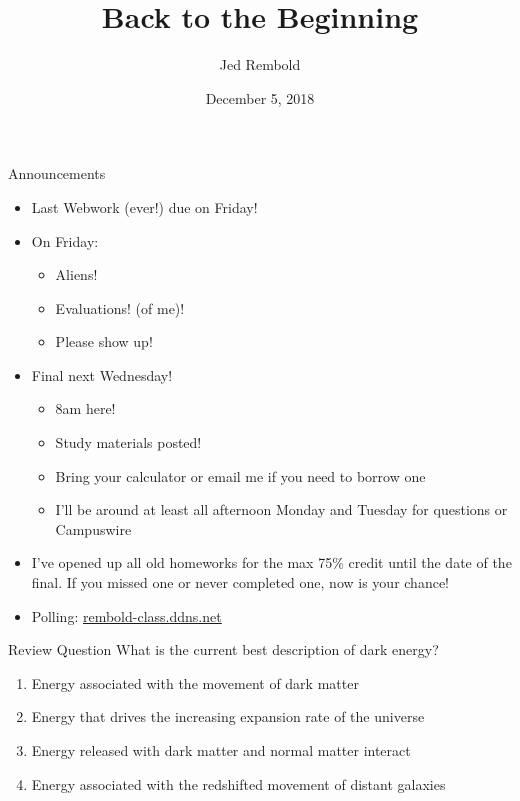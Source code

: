 \documentclass[pdf,aspectratio=169]{beamer}
\title{Back to the Beginning}
\date{December 5, 2018}
\author{Jed Rembold}
\begin{document}
\renewcommand*{\theenumi}{\Alph{enumi}}

\begin{frame}{Announcements}
  \begin{itemize}
	  \item Last Webwork (ever!) due on Friday!
	  \item On Friday:
		  \begin{itemize}
		  	\item Aliens!
			\item Evaluations! (of me)!
			\item Please show up!
		  \end{itemize}
	\item Final next Wednesday!
	  \begin{itemize}
		\item 8am here!
		\item Study materials posted!
		\item Bring your calculator or email me if you need to borrow one
		\item I'll be around at least all afternoon Monday and Tuesday for questions or Campuswire
	  \end{itemize}
	  \item I've opened up all old homeworks for the max 75\% credit until the date of the final. If you missed one or never completed one, now is your chance!
	\item Polling: \url{rembold-class.ddns.net}
  \end{itemize}
\end{frame}

\begin{frame}{Review Question}
	What is the current best description of dark energy?
	\begin{enumerate}
		\item Energy associated with the movement of dark matter
		\item \alert<2>{Energy that drives the increasing expansion rate of the universe}
		\item Energy released with dark matter and normal matter interact
		\item Energy associated with the redshifted movement of distant galaxies
	\end{enumerate}
\end{frame}
\end{document}
